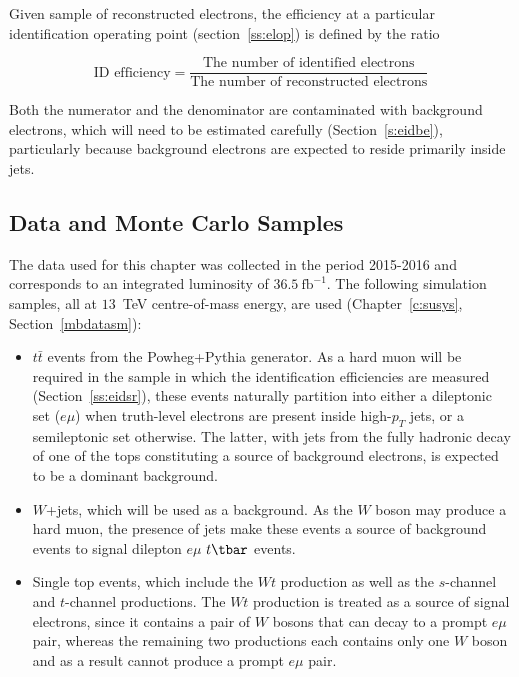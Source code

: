 Given sample of reconstructed electrons, the efficiency at a particular
identification operating point (section~\ref{ss:elop}) is defined by the ratio

$$
	\text{ID efficiency} = \frac{\text{The number of identified
			electrons}}{\text{The number of reconstructed electrons}}
$$

Both the numerator and the denominator are contaminated with background
electrons, which will need to be estimated carefully (Section~\ref{s:eidbe}),
particularly because background electrons are expected to reside primarily
inside jets.

\subsection{Data and Monte Carlo Samples}\label{ss:eidsp}

The data used for this chapter was collected in the period 2015-2016 and
corresponds to an integrated luminosity of $36.5~\text{fb}^{-1}$. The following
simulation samples, all at $13$~TeV centre-of-mass energy, are used
(Chapter~\ref{c:susys}, Section~\ref{mbdatasm}):

\begin{itemize}

	\item $t\bar{t}$ events from the Powheg+Pythia generator. As a hard muon will
	      be required in the sample in which the identification efficiencies are measured
	      (Section~\ref{ss:eidsr}), these events naturally partition into either a
	      dileptonic set ($e\mu$) when truth-level electrons are present inside
	      high-$p_T$ jets, or a semileptonic set otherwise. The latter, with jets from
	      the fully hadronic decay of one of the tops constituting a source of background
	      electrons, is expected to be a dominant background.

	\item $W$+jets, which will be used as a background. As the $W$ boson may
	      produce a hard muon, the presence of jets make these events a source of
	      background events to signal dilepton $e\mu$ $t\tbar$ events.

	\item Single top events, which include the $Wt$ production as well as the
	      $s$-channel and $t$-channel productions. The $Wt$ production is treated as a
	      source of signal electrons, since it contains a pair of $W$ bosons that can
	      decay to a prompt $e\mu$ pair, whereas the remaining two productions each
	      contains only one $W$ boson and as a result cannot produce a prompt $e\mu$
	      pair.

\end{itemize}
